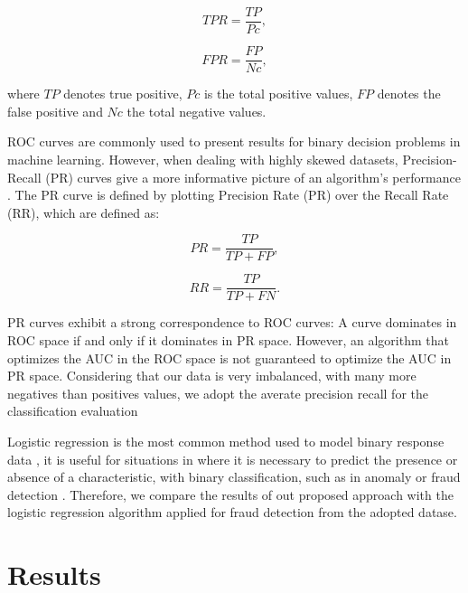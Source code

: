 \begin{equation}\label{eq:4_eq04}
	TPR = \frac{TP}{Pc},
\end{equation}

\begin{equation}\label{eq:4_eq05}
	FPR = \frac{FP}{Nc},
\end{equation}

where $TP$ denotes true positive, $Pc$ is the total positive values, $FP$ denotes the false positive and $Nc$ the total negative values.

ROC curves are commonly used to present results for binary decision problems in machine learning. However, when dealing with highly skewed datasets, Precision-Recall (PR) curves give a more informative picture of an algorithm’s performance \cite{davis2006relationship, he2009learning}. The PR curve is defined by plotting Precision Rate (PR) over the Recall Rate (RR), which are defined as:

\begin{equation}\label{eq:4_eq06}
	PR = \frac{TP}{TP + FP},
\end{equation}

\begin{equation}\label{eq:4_eq07}
	RR = \frac{TP}{TP + FN}.
\end{equation}

PR curves exhibit a strong correspondence to ROC curves: A curve dominates in ROC space if and only if it dominates in PR space. However, an algorithm that optimizes the AUC in the ROC space is not guaranteed to optimize the AUC in PR space. Considering that our data is very imbalanced, with many more negatives than positives values, we adopt the averate precision recall for the classification evaluation

Logistic regression is the most common method used to model binary response data \cite{hilbe2011logistic}, it is useful for situations in where it is necessary to predict the presence or absence of a characteristic, with binary classification, such as in anomaly or fraud detection \cite{bhattacharyya2011data}. Therefore, we compare the results of out proposed approach with the logistic regression algorithm applied for fraud detection from the adopted datase.


\section{Results}
\label{sec:4_results}


